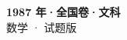 \documentclass[zihao=-4, a4paper]{ctexart}
\begin{document}
\begin{center}
  {\Large\bfseries 1987 年·全国卷·文科}\\[4pt]
  {\large 数学 · 试题版}
\end{center}
\medskip
{}

\end{document}
